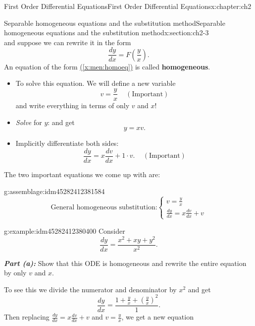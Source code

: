 \documentclass[oneside,10pt,]{book}
\newcommand{\alert}[1]{\textbf{\textit{#1}}}
\newcommand{\terminology}[1]{\textbf{#1}}
\numberwithin{equation}{section}
\numberwithin{equation}{section}
\begin{document}
\begin{chapterptx}{First Order Differential Equations}{}{First Order Differential Equations}{}{}{x:chapter:ch2}
\begin{sectionptx}{Separable homogeneous equations and the substitution method}{}{Separable homogeneous equations and the substitution method}{}{}{x:section:ch2-3}
\begin{equation*}
\end{equation*}
and suppose we can rewrite it in the form%
\begin{equation}
\frac{dy}{dx}=F\left(\frac{y}{x}\right).\label{x:men:homoeq}
\end{equation}
An equation of the form \hyperref[x:men:homoeq]{(\ref{x:men:homoeq})} is called \terminology{homogeneous}.%
%
\begin{itemize}[label=\textbullet]
\item{}To solve this equation. We will define a new variable%
\begin{equation*}
v=\frac{y}{x}\,\,\,\,\,\,\,(\text{Important})
\end{equation*}
and write everything in terms of only \(v\) and \(x\)!%
\item{}\emph{Solve} for \(y\): and get%
\begin{equation*}
y=xv.
\end{equation*}
%
\item{}Implicitly differentiate both sides:%
\begin{equation*}
\frac{dy}{dx}=x\frac{dv}{dx}+1\cdot v.\,\,\,\,\,\,\,(\text{Important})
\end{equation*}
%
\end{itemize}
The two important equations we come up with are:%
\begin{assemblage}{}{g:assemblage:idm45282412381584}%
%
\begin{equation*}
\text{General homogeneous substitution:}\begin{cases}
v=\frac{y}{x}\\
\frac{dy}{dx}=x\frac{dv}{dx}+v
\end{cases}
\end{equation*}
%
\end{assemblage}
\begin{example}{}{g:example:idm45282412380400}%
Consider%
\begin{equation*}
\frac{dy}{dx}=\frac{x^{2}+xy+y^{2}}{x^{2}}.
\end{equation*}
%
\par
\alert{Part (a):} Show that this ODE is homogeneous and rewrite the entire equation by only \(v\) and \(x\).%
\par
To see this we divide the numerator and denominator by \(x^{2}\) and get%
\begin{equation*}
\frac{dy}{dx}=\frac{1+\frac{y}{x}+\left(\frac{y}{x}\right)^{2}}{1}.
\end{equation*}
Then replacing \(\frac{dy}{dx}=x\frac{dv}{dx}+v\) and \(v=\frac{y}{x}\), we get a new equation%

\end{example}
\end{sectionptx}
\end{chapterptx}
\end{document}
